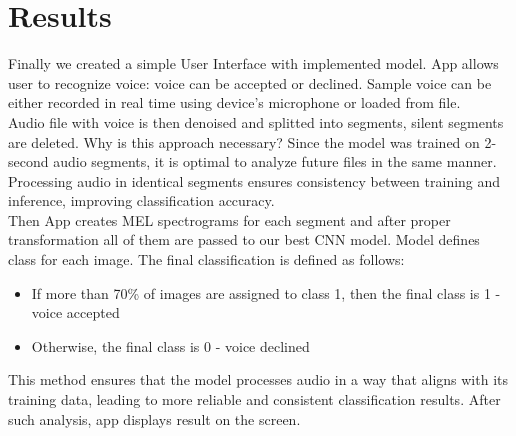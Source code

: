 \documentclass[11pt, letterpaper]{article}
\begin{document}
\section{Results}
Finally we created a simple User Interface with implemented model. App allows user to recognize voice: voice can be accepted or declined. Sample voice can be either recorded in real time using device's microphone or loaded from file. \\
Audio file with voice is then denoised and splitted into segments, silent segments are deleted. Why is this approach necessary? Since the model was trained on 2-second audio segments, it is optimal to analyze future files in the same manner. Processing audio in identical segments ensures consistency between training and inference, improving classification accuracy. \\
Then App creates MEL spectrograms for each segment and after proper transformation all of them are passed to our best CNN model. Model defines class for each image. The final classification is defined as follows:
\begin{itemize}
\item If more than 70\% of images are assigned to class 1, then the final class is 1 - voice accepted
\item Otherwise, the final class is 0 - voice declined
\end{itemize}
This method ensures that the model processes audio in a way that aligns with its training data, leading to more reliable and consistent classification results. After such analysis, app displays result on the screen.
\end{document}
